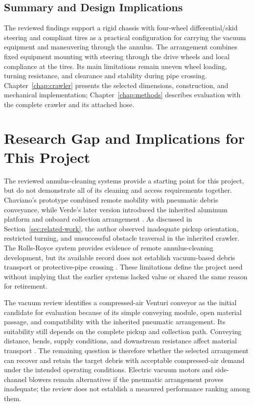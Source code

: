 \subsection{Summary and Design Implications}
\label{sec:mechanical-design-implications}
The reviewed findings support a rigid chassis with four-wheel differential/skid steering and compliant tires as a practical configuration for carrying the vacuum equipment and maneuvering through the annulus. The arrangement combines fixed equipment mounting with steering through the drive wheels and local compliance at the tires. Its main limitations remain uneven wheel loading, turning resistance, and clearance and stability during pipe crossing. Chapter~\ref{chap:crawler} presents the selected dimensions, construction, and mechanical implementation; Chapter~\ref{chap:methods} describes evaluation with the complete crawler and its attached hose.
\par
\endgroup

\section{Research Gap and Implications for This Project}
\label{sec:research-gap}
The reviewed annulus-cleaning systems provide a starting point for this project, but do not demonstrate all of its cleaning and access requirements together. Chaviano's prototype combined remote mobility with pneumatic debris conveyance, while Verde's later version introduced the inherited aluminum platform and onboard collection arrangement \citep{chaviano2025Crawler,verde2025Crawler}. As discussed in Section~\ref{sec:related-work}, the author observed inadequate pickup orientation, restricted turning, and unsuccessful obstacle traversal in the inherited crawler. The Rolls-Royce system provides evidence of remote annulus-cleaning development, but its available record does not establish vacuum-based debris transport or protective-pipe crossing \citep{hanford2022AnnulusCleaner}. These limitations define the project need without implying that the earlier systems lacked value or shared the same reason for retirement.

The vacuum review identifies a compressed-air Venturi conveyor as the initial candidate for evaluation because of its simple conveying module, open material passage, and compatibility with the inherited pneumatic arrangement. Its suitability still depends on the complete pickup and collection path. Conveying distance, bends, supply conditions, and downstream resistance affect material transport \citep{exairLineVacFAQ,evans2013LineVacBackPressure}. The remaining question is therefore whether the selected arrangement can recover and retain the target debris with acceptable compressed-air demand under the intended operating conditions. Electric vacuum motors and side-channel blowers remain alternatives if the pneumatic arrangement proves inadequate; the review does not establish a measured performance ranking among them.

